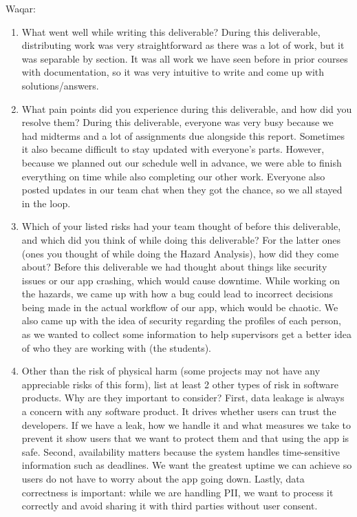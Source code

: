 \documentclass{article}
\begin{document}
Waqar:
\begin{enumerate}
    \item What went well while writing this deliverable?
    During this deliverable, distributing work was very straightforward as there
    was a lot of work, but it was separable by section. It was all work we have
    seen before in prior courses with documentation, so it was very intuitive to
    write and come up with solutions/answers.

    \item What pain points did you experience during this deliverable, and how
    did you resolve them?
    During this deliverable, everyone was very busy because we had midterms and
    a lot of assignments due alongside this report. Sometimes it also became
    difficult to stay updated with everyone's parts. However, because we planned
    out our schedule well in advance, we were able to finish everything on time
    while also completing our other work. Everyone also posted updates in our
    team chat when they got the chance, so we all stayed in the loop.

    \item Which of your listed risks had your team thought of before this
    deliverable, and which did you think of while doing this deliverable? For
    the latter ones (ones you thought of while doing the Hazard Analysis), how
    did they come about?
    Before this deliverable we had thought about things like security issues or
    our app crashing, which would cause downtime. While working on the hazards,
    we came up with how a bug could lead to incorrect decisions being made in the
    actual workflow of our app, which would be chaotic. We also came up with the
    idea of security regarding the profiles of each person, as we wanted to
    collect some information to help supervisors get a better idea of who they
    are working with (the students).

    \item Other than the risk of physical harm (some projects may not have any
    appreciable risks of this form), list at least 2 other types of risk in
    software products. Why are they important to consider?
    First, data leakage is always a concern with any software product. It drives
    whether users can trust the developers. If we have a leak, how we handle it
    and what measures we take to prevent it show users that we want to protect
    them and that using the app is safe. Second, availability matters because the
    system handles time-sensitive information such as deadlines. We want the
    greatest uptime we can achieve so users do not have to worry about the app
    going down. Lastly, data correctness is important: while we are handling PII,
    we want to process it correctly and avoid sharing it with third parties
    without user consent.
\end{enumerate}
\end{document}

